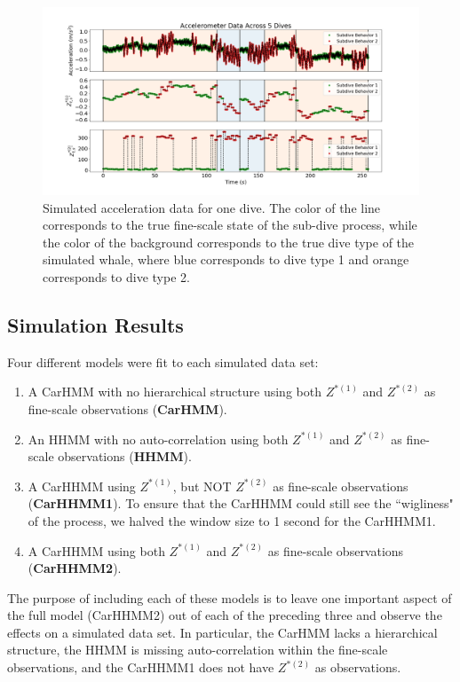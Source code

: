 \begin{figure}[!ht]
	\centering
	\includegraphics[width=5in]{../Plots/sim_data.png}
	\caption{Simulated acceleration data for one dive. The color of the line corresponds to the true fine-scale state of the sub-dive process, while the color of the background corresponds to the true dive type of the simulated whale, where blue corresponds to dive type 1 and orange corresponds to dive type 2.}
	\label{fig:sim_data}
\end{figure}


\subsection{Simulation Results}

Four different models were fit to each simulated data set:

\begin{enumerate}
    \item A CarHMM with no hierarchical structure using both $Z^{*(1)}$ and $Z^{*(2)}$ as fine-scale observations (\textbf{CarHMM}).
    \item An HHMM with no auto-correlation using both $Z^{*(1)}$ and $Z^{*(2)}$ as fine-scale observations (\textbf{HHMM}).
    \item A CarHHMM using $Z^{*(1)}$, but NOT $Z^{*(2)}$ as fine-scale observations (\textbf{CarHHMM1}). To ensure that the CarHHMM could still see the ``wigliness" of the process, we halved the window size to 1 second for the CarHHMM1.
    \item A CarHHMM using both $Z^{*(1)}$ and $Z^{*(2)}$ as fine-scale observations (\textbf{CarHHMM2}).
\end{enumerate}
%
The purpose of including each of these models is to leave one important aspect of the full model (CarHHMM2) out of each of the preceding three and observe the effects on a simulated data set. In particular, the CarHMM lacks a hierarchical structure, the HHMM is missing auto-correlation within the fine-scale observations, and the CarHHMM1 does not have $Z^{*(2)}$ as observations.

